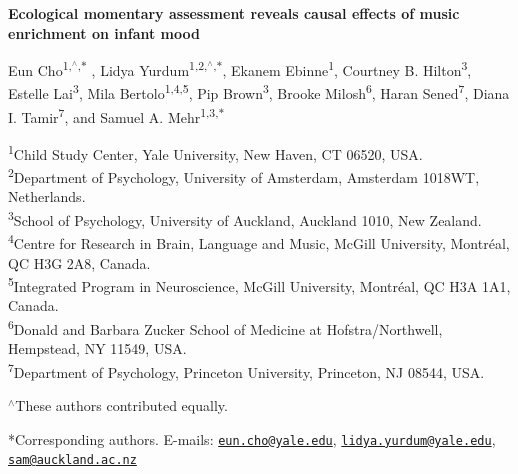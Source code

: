 \documentclass[
]{article}
\author{}
\date{\vspace{-2.5em}}
\begin{document}
\raggedright
\LARGE

\textbf{Ecological momentary assessment reveals causal effects of music enrichment on infant mood}

\vspace{0.1in}

\justifying
\normalsize

Eun Cho\textsuperscript{1,\(^{\wedge}\),\(\ast\)} , Lidya
Yurdum\textsuperscript{1,2,\(^{\wedge}\),\(\ast\)}, Ekanem
Ebinne\textsuperscript{1}, Courtney B. Hilton\textsuperscript{3},
Estelle Lai\textsuperscript{3}, Mila Bertolo\textsuperscript{1,4,5}, Pip
Brown\textsuperscript{3}, Brooke Milosh\textsuperscript{6}, Haran
Sened\textsuperscript{7}, Diana I. Tamir\textsuperscript{7}, and Samuel
A. Mehr\textsuperscript{1,3,\(\ast\)}

\small

\textsuperscript{1}Child Study Center, Yale University, New Haven, CT
06520, USA.\\
\textsuperscript{2}Department of Psychology, University of Amsterdam,
Amsterdam 1018WT, Netherlands.\\
\textsuperscript{3}School of Psychology, University of Auckland,
Auckland 1010, New Zealand.\\
\textsuperscript{4}Centre for Research in Brain, Language and Music,
McGill University, Montréal, QC H3G 2A8, Canada.\\
\textsuperscript{5}Integrated Program in Neuroscience, McGill
University, Montréal, QC H3A 1A1, Canada.\\
\textsuperscript{6}Donald and Barbara Zucker School of Medicine at
Hofstra/Northwell, Hempstead, NY 11549, USA.\\
\textsuperscript{7}Department of Psychology, Princeton University,
Princeton, NJ 08544, USA.

\(^{\wedge}\)These authors contributed equally.

*Corresponding authors. E-mails:
\href{mailto:eun.cho@yale.edu}{\nolinkurl{eun.cho@yale.edu}},
\href{mailto:lidya.yurdum@yale.edu}{\nolinkurl{lidya.yurdum@yale.edu}},
\href{mailto:sam@auckland.ac.nz}{\nolinkurl{sam@auckland.ac.nz}}

\bigskip
\end{document}
